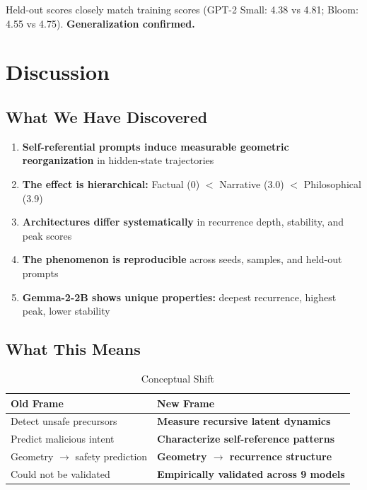 \documentclass[12pt,a4paper]{article}
\begin{document}
Held-out scores closely match training scores (GPT-2 Small: 4.38 vs 4.81; Bloom: 4.55 vs 4.75). \textbf{Generalization confirmed.}

\section{Discussion}

\subsection{What We Have Discovered}

\begin{enumerate}[noitemsep]
    \item \textbf{Self-referential prompts induce measurable geometric reorganization} in hidden-state trajectories
    \item \textbf{The effect is hierarchical:} Factual (0) $<$ Narrative (3.0) $<$ Philosophical (3.9)
    \item \textbf{Architectures differ systematically} in recurrence depth, stability, and peak scores
    \item \textbf{The phenomenon is reproducible} across seeds, samples, and held-out prompts
    \item \textbf{Gemma-2-2B shows unique properties:} deepest recurrence, highest peak, lower stability
\end{enumerate}

\subsection{What This Means}

\begin{table}[h]
\centering
\caption{Conceptual Shift}
\begin{tabular}{ll}
\toprule
\textbf{Old Frame} & \textbf{New Frame} \\
\midrule
Detect unsafe precursors & \textbf{Measure recursive latent dynamics} \\
Predict malicious intent & \textbf{Characterize self-reference patterns} \\
Geometry $\rightarrow$ safety prediction & \textbf{Geometry $\rightarrow$ recurrence structure} \\
Could not be validated & \textbf{Empirically validated across 9 models} \\
\bottomrule
\end{tabular}
\end{table}
\end{document}
